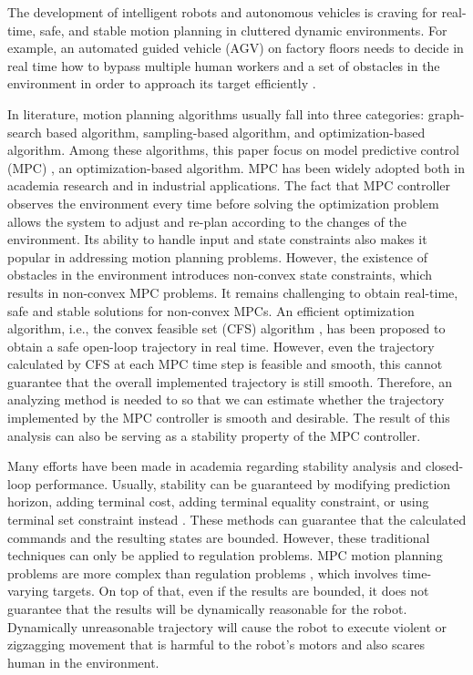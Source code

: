 The development of intelligent robots and autonomous vehicles is craving for real-time, safe, and stable motion planning in cluttered dynamic environments. For example, an automated guided vehicle (AGV) on factory floors \cite{wu2004modeling} needs to decide in real time how to bypass multiple human workers and a set of obstacles in the environment in order to approach its target efficiently \cite{wang2009autonomous,oleari2014industrial}. 

In literature, motion planning algorithms usually fall into three categories: graph-search based algorithm, sampling-based algorithm, and optimization-based algorithm. Among these algorithms, this paper focus on model predictive control (MPC) \cite{rawlings1999tutorial}, an optimization-based algorithm. MPC has been widely adopted both in academia research and in industrial applications. The fact that MPC controller observes the environment every time before solving the optimization problem allows the system to adjust and re-plan according to the changes of the environment. Its ability to handle input and state constraints also makes it popular in addressing motion planning problems. However, the existence of obstacles in the environment introduces non-convex state constraints, which results in non-convex MPC problems. It remains challenging to obtain real-time, safe and stable solutions for non-convex MPCs. An efficient optimization algorithm, i.e., the convex feasible set (CFS) algorithm \cite{liu2018convex}, has been proposed to obtain a safe open-loop trajectory in real time. However, even the trajectory calculated by CFS at each MPC time step is feasible and smooth, this cannot guarantee that the overall implemented trajectory is still smooth. Therefore, an analyzing method is needed to so that we can estimate whether the trajectory implemented by the MPC controller is smooth and desirable. The result of this analysis can also be serving as a stability property of the MPC controller.

Many efforts have been made in academia regarding stability analysis and closed-loop performance. Usually, stability can be guaranteed by modifying prediction horizon, adding terminal cost, adding terminal equality constraint, or using terminal set constraint instead \cite{mayne2000constrained}. These methods can guarantee that the calculated commands and the resulting states are bounded. However, these traditional techniques can only be applied to regulation problems. MPC motion planning problems are more complex than regulation problems \cite{limon2006stability}, which involves time-varying targets. On top of that,
even if the results are bounded, it does not guarantee that the results will be dynamically reasonable for the robot. Dynamically unreasonable trajectory will cause the robot to execute violent or zigzagging movement that is harmful to the robot's motors and also scares human in the environment.  

